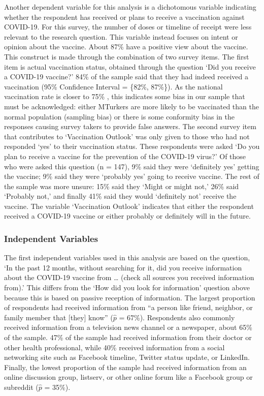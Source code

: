 Another dependent variable for this analysis is a dichotomous variable
indicating whether the respondent has received or plans to receive a vaccination
against COVID-19. For this survey, the number of doses or timeline of receipt
were less relevant to the research question. This variable instead focuses on
intent or opinion about the vaccine. About 87\% have a positive view about the
vaccine. This construct is made through the combination of two survey items. The
first item is actual vaccination status, obtained through the question `Did you
receive a COVID-19 vaccine?' 84\% of the sample said that they had indeed
received a vaccination (95\% Confidence Interval = \{82\%, 87\%\}). As the
national vaccination rate is closer to 75\% \citep{cdc20}, this indicates some
bias in our sample that must be acknowledged: either MTurkers are more likely to
be vaccinated than the normal population (sampling bias) or there is some
conformity bias in the responses causing survey takers to provide false answers.
The second survey item that contributes to `Vaccination Outlook' was only given
to those who had not responded `yes' to their vaccination status. These
respondents were asked `Do you plan to receive a vaccine for the prevention of
the COVID-19 virus?' Of those who were asked this question (n = 147), 9\% said
they were `definitely yes' getting the vaccine; 9\% said they were `probably
yes' going to receive vaccine. The rest of the sample was more unsure: 15\% said
they `Might or might not,' 26\% said `Probably not,' and finally 41\% said they
would `definitely not' receive the vaccine. The variable `Vaccination Outlook'
indicates that either the respondent received a COVID-19 vaccine or either
probably or definitely will in the future.




\hypertarget{independent-variables}{\subsubsection{Independent Variables}\label{independent-variables}}

The first independent variables used in this analysis are based on the question,
`In the past 12 months, without searching for it, did you receive information
about the COVID-19 vaccine from \ldots{} (check all sources you received
information from).' This differs from the `How did you look for information'
question above because this is based on passive reception of information. The
largest proportion of respondents had received information from ``a person like
friend, neighbor, or family member that [they] know'' (\(\widehat{p}\) = 67\%).
Respondents also commonly received information from a television news channel or
a newspaper, about 65\% of the sample. 47\% of the sample had received
information from their doctor or other health professional, while 40\% received
information from a social networking site such as Facebook timeline, Twitter
status update, or LinkedIn. Finally, the lowest proportion of the sample had
received information from an online discussion group, listserv, or other online
forum like a Facebook group or subreddit (\(\widehat{p}\) = 35\%).


